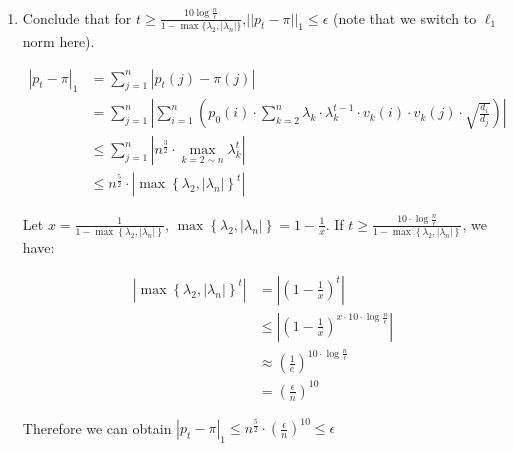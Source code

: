\begin{enumerate}
	\item Conclude that for $t\ge\frac{10\log{\frac{n}{\epsilon}}}{1-\max\{\lambda_2,|\lambda_n|\}}$,$||p_t-\pi||_1\le\epsilon$ (note that we switch to $\ell_1$ norm here).
	
  \Answer
  
  \begin{equation}
    \begin{aligned}
    \left|p_t-\pi\right|_1 &=\sum_{j=1}^n\left|p_t(j)-\pi(j)\right| \\
    &=\sum_{j=1}^n\left|\sum_{i=1}^n\left(p_0(i) \cdot \sum_{k=2}^n \lambda_k \cdot \lambda_k^{t-1} \cdot v_k(i) \cdot v_k(j) \cdot \sqrt{\frac{d_i}{d_j}}\right)\right| \\
    & \leq \sum_{j=1}^n\left|n^{\frac{3}{2}} \cdot \max _{k=2 \sim n} \lambda_k^t\right| \\
    & \leq n^{\frac{5}{2}} \cdot\left|\max \left\{\lambda_2,\left|\lambda_n\right|\right\}^t\right|
    \end{aligned}
  \end{equation}
 
 Let $x=\frac{1}{1-\max \left\{\lambda_2,\left|\lambda_n\right|\right\}}$, $\max \left\{\lambda_2,\left|\lambda_n\right|\right\}=1-\frac{1}{x}$. If $t \geq \frac{10 \cdot \log \frac{n}{\epsilon}}{1-\max \left\{\lambda_2,\left|\lambda_n\right|\right\}}$, we have:

  \begin{equation}
    \begin{aligned}
    \left|\max \left\{\lambda_2,\left|\lambda_n\right|\right\}^t\right| &=\left|\left(1-\frac{1}{x}\right)^t\right| \\
    & \leq\left|\left(1-\frac{1}{x}\right)^{x \cdot 10 \cdot \log \frac{n}{\epsilon}}\right| \\
    & \approx\left(\frac{1}{e}\right)^{10 \cdot \log \frac{n}{\epsilon}} \\
    &=\left(\frac{\epsilon}{n}\right)^{10}
    \end{aligned}
  \end{equation}
 
 Therefore we can obtain $\left|p_t-\pi\right|_1  \leq n^{\frac{5}{2}} \cdot\left(\frac{\epsilon}{n}\right)^{10} \leq \epsilon$

\end{enumerate}

